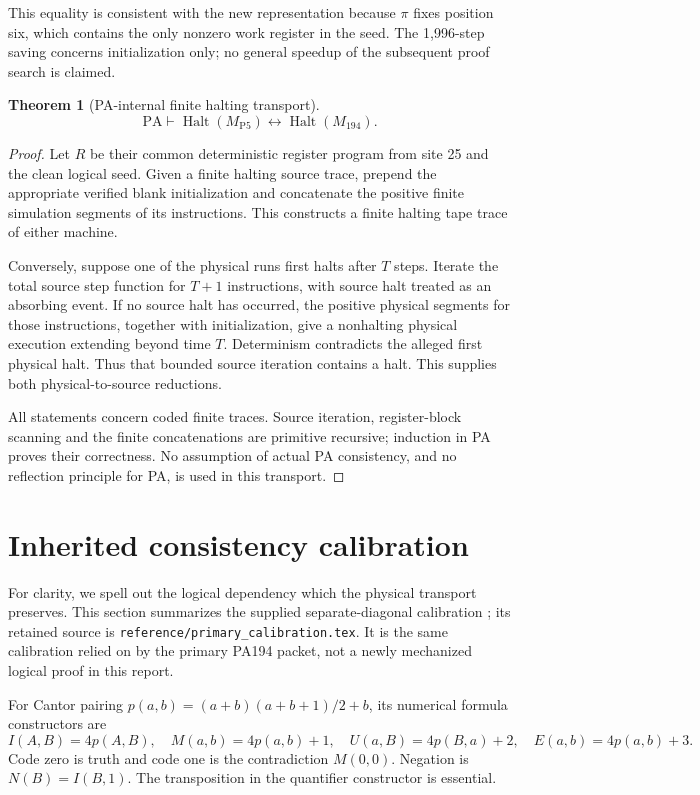 \documentclass[11pt,letterpaper]{article}
\newcommand{\PA}{\mathrm{PA}}
\newcommand{\Halt}{\operatorname{Halt}}
\newcommand{\file}[1]{\texttt{\nolinkurl{#1}}}
\newcommand{\old}{M_{194}}
\newcommand{\new}{M_{\mathrm{P5}}}
\newtheorem{theorem}{Theorem}[section]
\begin{document}
This equality is consistent with the new representation because
$\pi$ fixes position six, which contains the only nonzero work
register in the seed. The 1,996-step saving concerns initialization
only; no general speedup of the subsequent proof search is claimed.

\begin{theorem}[PA-internal finite halting transport]
\[
             \PA\vdash
             \Halt(\new)\leftrightarrow\Halt(\old).
\]
\end{theorem}
\begin{proof}
Let $R$ be their common deterministic register program from site 25
and the clean logical seed. Given a finite halting source trace,
prepend the appropriate verified blank initialization and concatenate
the positive finite simulation segments of its instructions.
This constructs a finite halting tape trace of either machine.

Conversely, suppose one of the physical runs first halts after $T$
steps. Iterate the total source step function for $T+1$ instructions,
with source halt treated as an absorbing event. If no source halt
has occurred, the positive physical segments for those instructions,
together with initialization, give a nonhalting physical execution
extending beyond time $T$. Determinism contradicts the alleged
first physical halt. Thus that bounded source iteration contains
a halt. This supplies both physical-to-source reductions.

All statements concern coded finite traces. Source iteration,
register-block scanning and the finite concatenations are primitive
recursive; induction in PA proves their correctness. No assumption
of actual PA consistency, and no reflection principle for PA,
is used in this transport.
\end{proof}

\section{Inherited consistency calibration}
\label{sec:calibration}

For clarity, we spell out the logical dependency which the physical
transport preserves. This section summarizes the supplied
separate-diagonal calibration \cite{primary,calibration}; its retained
source is \file{reference/primary_calibration.tex}.
It is the same calibration relied on by the primary PA194 packet,
not a newly mechanized logical proof in this report.

For Cantor pairing $p(a,b)=(a+b)(a+b+1)/2+b$, its numerical
formula constructors are
\[
 I(A,B)=4p(A,B),\quad M(a,b)=4p(a,b)+1,\quad
 U(a,B)=4p(B,a)+2,\quad E(a,b)=4p(a,b)+3.
\]
Code zero is truth and code one is the contradiction $M(0,0)$.
Negation is $N(B)=I(B,1)$. The transposition in the quantifier
constructor is essential.
\end{document}
